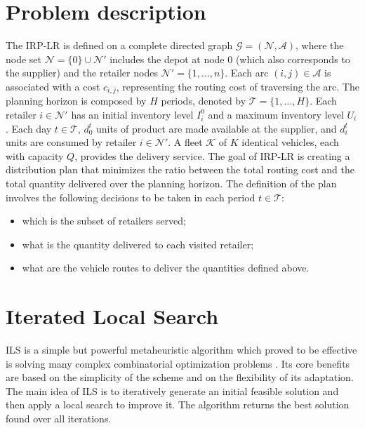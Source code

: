 \documentclass{article}
\begin{document}
\section{Problem description}

The IRP-LR is defined on a complete directed graph $\mathcal{G} = (\mathcal{N}, \mathcal{A})$, where the node set $\mathcal{N} = \{0\} \cup \mathcal{N}'$ includes the  depot at node $0$ (which also corresponds to the supplier) and the retailer nodes $\mathcal{N}' = \{1, \ldots, n\}$. Each arc  $(i, j) \in \mathcal{A}$ is associated with a cost $c_{i,j}$, representing the routing cost of traversing the arc. The planning horizon is composed by $H$ periods, denoted by $\mathcal{T} = \{1, \ldots ,H\}$. Each retailer $i \in \mathcal{N}'$ has an initial inventory level $I_i^0$ and a maximum inventory level $U_i$. 
Each day $t \in \mathcal{T}$, $d_{0}^t$ units of product are made available at the supplier, and $d_i^t$ units are consumed by retailer $i \in \mathcal{N}'$. A fleet $\mathcal{K}$ of $K$ identical vehicles, each with capacity $Q$, provides the delivery service. The goal of IRP-LR is creating a distribution plan that minimizes the ratio between the total routing cost and the total quantity delivered over the planning horizon. The definition of the plan involves the following decisions to be taken in each period $t \in \mathcal{T}$:

\begin{itemize}
    \item which is the subset of retailers served;
    \item what is the quantity delivered to each visited retailer;
    \item what are the vehicle routes to deliver the quantities defined above.
\end{itemize}


\section{Iterated Local Search}

ILS is a simple but powerful metaheuristic algorithm which proved to be effective is solving many complex combinatorial optimization problems \cite{lourencco2018iterated}. Its core benefits are based on the simplicity of the scheme and on the flexibility of its adaptation. The main idea of ILS is to iteratively generate an initial feasible solution and then apply a local search to improve it. The algorithm returns the best solution found over all iterations.
\end{document}
